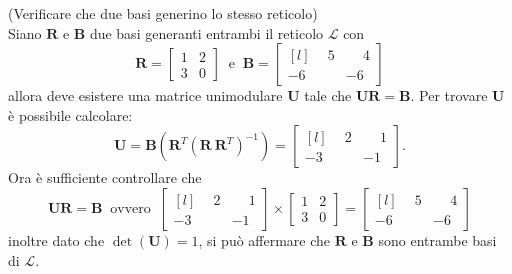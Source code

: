 \begin{exmp} (Verificare che due basi generino lo stesso reticolo)
    \label{exp:basis}
    \\
    Siano $\mathbf{R}$ e $\mathbf{B}$ due basi generanti entrambi il reticolo $\mathcal{L}$
    con
    \begin{equation*}
        \mathbf{R} =
        \begin{bmatrix}
            1 & 2\\
            3 & 0
        \end{bmatrix}
        \ \text{ e } \ 
        \mathbf{B} =
        \begin{bmatrix*}[l]
            \phantom{-}5 & \phantom{-}4\\
            -6 & -6
        \end{bmatrix*}
    \end{equation*}
    allora deve esistere una matrice unimodulare $\mathbf{U}$ tale che 
    $\mathbf{U}\mathbf{R} = \mathbf{B}$. Per trovare $\mathbf{U}$ è possibile
    calcolare:
    \begin{equation*}
        \mathbf{U} = \mathbf{B}(\mathbf{R}^T (\mathbf{R} \ \mathbf{R}^T)^{-1}) =
        \begin{bmatrix*}[l]
            \phantom{-}2 & \phantom{-}1\\
            -3 & -1
        \end{bmatrix*}.
    \end{equation*}
    Ora è sufficiente controllare che
    \begin{equation*}
        \mathbf{U}\mathbf{R} = \mathbf{B}
        \ \text{ ovvero } \
        \begin{bmatrix*}[l]
            \phantom{-}2 & \phantom{-}1\\
            -3 & -1
        \end{bmatrix*}
        \times
        \begin{bmatrix}
            1 & 2\\
            3 & 0
        \end{bmatrix}
        =
        \begin{bmatrix*}[l]
            \phantom{-}5 & \phantom{-}4\\
            -6 & -6
        \end{bmatrix*}
    \end{equation*}
inoltre dato che $\det(\mathbf{U}) = 1$, si può affermare che $\mathbf{R}$ e $\mathbf{B}$
sono entrambe basi di $\mathcal{L}$.
\end{exmp}
